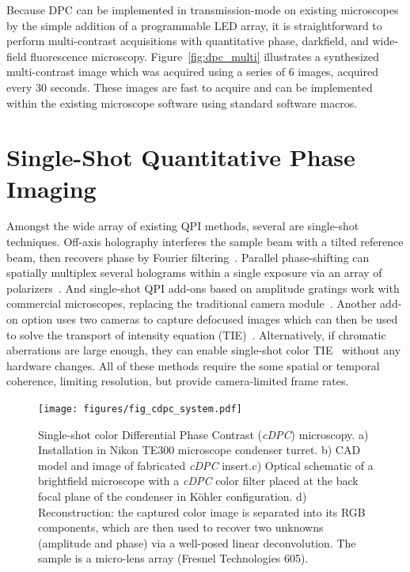 Because DPC can be implemented in transmission-mode on existing microscopes by the simple addition of a programmable LED array, it is straightforward to perform multi-contrast acquisitions with quantitative phase, darkfield, and wide-field fluorescence microscopy. Figure~\ref{fig:dpc_multi} illustrates a synthesized multi-contrast image which was acquired using a series of 6 images, acquired every 30 seconds. These images are fast to acquire and can be implemented within the existing microscope software using standard software macros.

\section{Single-Shot Quantitative Phase Imaging}\label{sec:phase:cdpc}
Amongst the wide array of existing QPI methods, several are single-shot techniques. Off-axis holography interferes the sample beam with a tilted reference beam, then recovers phase by Fourier filtering~\cite{Witte:12}. Parallel phase-shifting can spatially multiplex several holograms within a single exposure via an array of polarizers~\cite{2004singleshotPSDH}. And single-shot QPI add-ons based on amplitude gratings work with commercial microscopes, replacing the traditional camera module~\cite{phasics,bon2012method}. Another add-on option uses two cameras to capture defocused images which can then be used to solve the transport of intensity equation (TIE)~\cite{allman2005optical}. Alternatively, if chromatic aberrations are large enough, they can enable single-shot color TIE~\cite{gross:14} without any hardware changes. All of these methods require the some spatial or temporal coherence, limiting resolution, but provide camera-limited frame rates.

\begin{figure}[tbh]
\centering
\texttt{[image: figures/fig\_cdpc\_system.pdf]}
\caption{\label{fig:dpc_cdpchardware}
Single-shot color Differential Phase Contrast (\textit{cDPC}) microscopy. a) Installation in Nikon TE300 microscope condenser turret. b) CAD model and image of fabricated \textit{cDPC} insert.c) Optical schematic of a brightfield microscope with a \textit{cDPC} color filter placed at the back focal plane of the condenser in K\"{o}hler configuration. d) Reconstruction: the captured color image is separated into its RGB components, which are then used to recover two unknowns (amplitude and phase) via a well-posed linear deconvolution. The sample is a micro-lens array (Fresnel Technologies 605). }
\end{figure}


